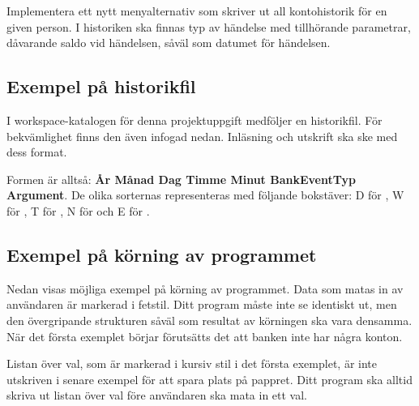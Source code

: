 \Task Implementera ett nytt menyalternativ som skriver ut all kontohistorik för en given person. I historiken ska finnas typ av händelse med tillhörande parametrar, dåvarande saldo vid händelsen, såväl som datumet för händelsen.

\subsection{Exempel på historikfil}

I workspace-katalogen för denna projektuppgift medföljer en historikfil. För bekvämlighet finns den även infogad nedan. Inläsning och utskrift ska ske med dess format.

\begin{multicols}{2}
\small

\end{multicols}

\noindent
Formen är alltså: \textbf{År  Månad  Dag  Timme  Minut  BankEventTyp  Argument}. De olika sorternas  representeras med följande bokstäver: D för , W för , T för , N för  och E för .

\subsection{Exempel på körning av programmet}

Nedan visas möjliga exempel på körning av programmet. Data som matas in av användaren är markerad i fetstil.
Ditt program måste inte se identiskt ut, men den övergripande strukturen såväl som resultat av körningen ska vara densamma.
När det första exemplet börjar förutsätts det att banken inte har några konton.

Listan över val, som är markerad i kursiv stil i det första exemplet, är inte utskriven i senare exempel för att spara plats på pappret. Ditt program ska alltid skriva ut listan över val före användaren ska mata in ett val.

\newenvironment{exampleblock}
	{\begin{minipage}{\columnwidth}
	 - - - - - - - - - - - - - - - - - - - - - - - - - - -\\}
	{\end{minipage}}

